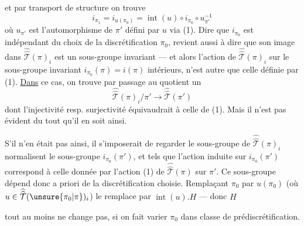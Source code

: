 

et par transport de structure on trouve
\[
i_{\pi_1}=i_{u(\pi_0)}=\operatorname{int}(u)\circ i_{\pi_0}\circ u_{\pi'}^{-1}
\]
où $u_{\pi'}$ est l'automorphisme de $\pi'$ défini par $u$ via (1). Dire que $i_{\pi_0}$ est indépendant du choix de la discrétification $\pi_0$, revient aussi à dire que son image dans $\widehat{\widehat{\mathcal T}}(\pi)_i$ est un sous-groupe invariant --- et alors l'action de $\widehat{\widehat{\mathcal T}}(\pi)_i$ sur \deleted{\unsure{$\pi$}} le sous-groupe invariant $i_{\pi_0}(\pi)=i(\pi)$    intérieurs, n'est autre que celle définie par (1). \uline{Dans} ce cas, on trouve par passage au quotient un 
\[
\tag{6}
\widehat{\widehat{\mathcal T}}(\pi)_i/\pi'\longrightarrow\widehat{\widehat{\mathcal T}}(\pi')
\]
dont l'injectivité resp. surjectivité équivaudrait à celle de (1). Mais il n'est pas évident du tout qu'il en soit  ainsi.

S'il n'en était pas ainsi, il  s'imposerait de regarder le sous-groupe de $\widehat{\widehat{\mathcal T}}(\pi)_i$   normalisent le sous-groupe  $i_{\pi_0}(\pi')$, et tels que l'action induite sur $i_{\pi_0}(\pi')$ correspond à celle donnée par l'action (1) de $\widehat{\widehat{\mathcal T}}(\pi)$ sur $\pi'$. Ce sous-groupe  dépend donc a priori de la discrétification choisie. Remplaçant $\pi_0$ par $u(\pi_0)$ (où  $u\in\widehat{\widehat{\mathcal T}}(\unsure{\pi_0|\pi})_i$) le remplace par $\operatorname{int}(u).H$ --- donc $H$



tout au moins ne change pas, si on fait varier $\pi_0$ dans  classe de prédiscrétification.

